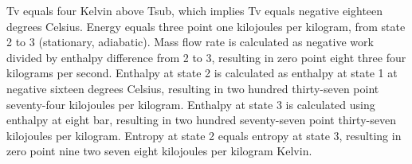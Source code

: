 Tv equals four Kelvin above Tsub, which implies Tv equals negative eighteen degrees Celsius. Energy equals three point one kilojoules per kilogram, from state 2 to 3 (stationary, adiabatic). Mass flow rate is calculated as negative work divided by enthalpy difference from 2 to 3, resulting in zero point eight three four kilograms per second. Enthalpy at state 2 is calculated as enthalpy at state 1 at negative sixteen degrees Celsius, resulting in two hundred thirty-seven point seventy-four kilojoules per kilogram. Enthalpy at state 3 is calculated using enthalpy at eight bar, resulting in two hundred seventy-seven point thirty-seven kilojoules per kilogram. Entropy at state 2 equals entropy at state 3, resulting in zero point nine two seven eight kilojoules per kilogram Kelvin.
